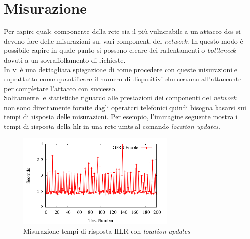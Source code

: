 \section{Misurazione}
Per capire quale componente della rete sia il più vulnerabile a un attacco \gls{dos} si devono fare delle misurazioni sui vari componenti del \textit{network}.
In questo modo è possibile capire in quale punto si possono creare dei rallentamenti o \textit{bottleneck} dovuti a un sovraffollamento di richieste.\\
In \cite{measuring-dos} vi è una dettagliata spiegazione di come procedere con queste misurazioni e soprattutto come quantificare il numero di dispositivi che 
servono all'attaccante per completare l'attacco con successo.\\
Solitamente le statistiche riguardo alle prestazioni dei componenti del \textit{network} non sono direttamente fornite dagli operatori telefonici quindi bisogna 
basarsi sui tempi di risposta delle misurazioni. Per esempio, l'immagine seguente mostra i tempi di risposta della \gls{hlr} in una rete \gls{umts} al comando \textit{location updates}.
\begin{figure}[h]
    \centering
    \includegraphics[width=0.7\textwidth]{images/hlr-measuring.png}
    \caption{Misurazione tempi di risposta HLR con \textit{location updates}\cite{measuring-dos}}
\end{figure}